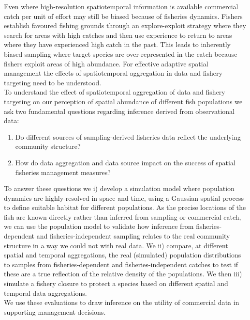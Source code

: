 \documentclass[preprint]{elsarticle}
\begin{document}
Even where high-resolution spatiotemporal information is available \citep[see
e.g.][]{Lee2010, Bastardie2010, Gerritsen2012, Mateo2016} commercial catch per
unit of effort may still be biased because of fisheries dynamics. Fishers
establish favoured fishing grounds through an explore-exploit strategy
\citep{Rijnsdorp2011, Bailey2018} where they search for areas with high catches
and then use experience to return to areas where they have experienced high
catch in the past. This leads to inherently biased sampling where target
species are over-represented in the catch because fishers exploit areas of high
abundance. For effective adaptive spatial management the effects of
spatiotemporal aggregation in data and fishery targeting need to be understood.
\\

To understand the effect of spatiotemporal aggregation of data and fishery
targeting on our perception of spatial abundance of different fish populations
we ask two fundamental questions regarding inference derived from observational
data:

\begin{enumerate}
	\item Do different sources of sampling-derived fisheries data reflect
		the underlying community structure? 	
	\item How do data aggregation and data source impact on the success of
		spatial fisheries management measures?
\end{enumerate}
	
To answer these questions we i) develop a simulation model where population
dynamics are highly-resolved in space and time, using a Gaussian spatial
process to define suitable habitat for different populations. As the precise
locations of the fish are known directly rather than inferred from sampling or
commercial catch, we can use the population model to validate how inference
from fisheries-dependent and fisheries-independent sampling relates to the real
community structure in a way we could not with real data. We ii) compare, at
different spatial and temporal aggregations, the real (simulated) population
distributions to samples from fisheries-dependent and fisheries-independent
catches to test if these are a true reflection of the relative density of the
populations. We then iii) simulate a fishery closure to protect a species based
on different spatial and temporal data aggregations. \\

We use these evaluations to draw inference on the utility of commercial data in
supporting management decisions.  
\end{document}
